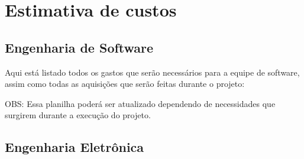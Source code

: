 \section{Estimativa de custos}

\subsection{Engenharia de Software}

Aqui está listado todos os gastos que serão necessários para a equipe de software, assim como todas as aquisições que serão feitas durante o projeto:

\begin{table}[h]
\end{table}

OBS: Essa planilha poderá ser atualizado dependendo de necessidades que surgirem durante a execução do projeto.


\subsection {Engenharia Eletrônica}

